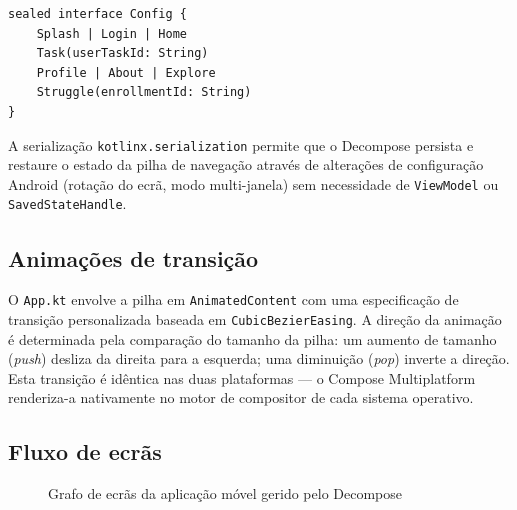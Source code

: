 \begin{verbatim}
sealed interface Config {
    Splash | Login | Home
    Task(userTaskId: String)
    Profile | About | Explore
    Struggle(enrollmentId: String)
}
\end{verbatim}

A serialização \texttt{kotlinx.serialization} permite que o Decompose
persista e restaure o estado da pilha de navegação através de alterações de
configuração Android (rotação do ecrã, modo multi-janela) sem necessidade
de \texttt{ViewModel} ou \texttt{SavedStateHandle}.

\subsection*{Animações de transição}

O \texttt{App.kt} envolve a pilha em \texttt{AnimatedContent} com uma
especificação de transição personalizada baseada em \texttt{CubicBezierEasing}.
A direção da animação é determinada pela comparação do tamanho da pilha:
um aumento de tamanho (\textit{push}) desliza da direita para a esquerda;
uma diminuição (\textit{pop}) inverte a direção.
Esta transição é idêntica nas duas plataformas — o Compose Multiplatform
renderiza-a nativamente no motor de compositor de cada sistema operativo.

\subsection*{Fluxo de ecrãs}

\begin{figure}[htbp]
  \centering
  \caption{Grafo de ecrãs da aplicação móvel gerido pelo Decompose}
  \label{fig:decompose_nav}
\end{figure}

